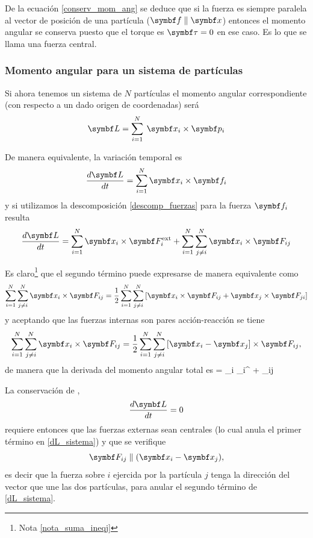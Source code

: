 \documentclass[10pt,oneside]{CBFT_book}
\begin{document}
De la ecuación \eqref{conserv_mom_ang} se deduce que si la fuerza es siempre paralela al vector de posición de una 
partícula ($\vb{f} \parallel \vb{x}$) entonces el momento angular  se conserva puesto que el torque es 
$\vb{\tau}=0$ en ese caso. Es lo que se llama una fuerza central.

\subsubsection{Momento angular para un sistema de partículas}

Si ahora tenemos un sistema de $N$ partículas el momento angular correspondiente (con respecto a un dado origen de
coordenadas) será
\[
	\vb{L} = \Sum{i=1}{N} \: \vb{x}_i \times \vb{p}_i
\]

De manera equivalente, la variación temporal es 
\[
	\dtot{\vb{L}}{t} = \Sum{i=1}{N} \vb{x}_i \times \vb{f}_i
\]
y si utilizamos la descomposición \eqref{descomp_fuerzas} para la fuerza $\vb{f}_i$ resulta
\[
	\dtot{\vb{L}}{t} = \Sum{i=1}{N} \vb{x}_i \times \vb{F}_i^\text{ext}  +
	\Sum{i=1}{N} \Sum{j\neq i}{N}  \vb{x}_i \times \vb{F}_{ij}
\]

Es claro\footnote{Nota \ref{nota_suma_ineqj}} que el segundo término puede expresarse de manera equivalente como 
\[
	\Sum{i=1}{N} \Sum{j\neq i}{N}  \vb{x}_i \times \vb{F}_{ij} =
	\frac{1}{2} 
	\Sum{i=1}{N} \Sum{j \neq i}{N}  \left[ \vb{x}_i \times \vb{F}_{ij} + \vb{x}_j \times \vb{F}_{ji} \right]
\]
y aceptando que las fuerzas internas son pares acción-reacción se tiene 
\[
	\Sum{i=1}{N} \Sum{j\neq i}{N}  \vb{x}_i \times \vb{F}_{ij} =
	\frac{1}{2} 
	\Sum{i=1}{N} \Sum{j \neq i}{N}  \left[ \vb{x}_i - \vb{x}_j \right] \times \vb{F}_{ij},
\]
de manera que la derivada del momento angular total es 
\be
	 =  _i \times {}_i^  +
	    \left[ \vb{x}_i - \vb{x}_j \right] \times {}_{ij} 
	\label{dL_sistema}
\ee

La conservación de ,
\[
	\dtot{\vb{L}}{t} = 0	
\]
requiere entonces que las fuerzas externas sean centrales (lo cual anula el primer término en \eqref{dL_sistema}) y que 
se verifique 
\[
	\vb{F}_{ij}  \parallel ( \vb{x}_i - \vb{x}_j ),
\]
es decir que la fuerza sobre $i$ ejercida por la partícula $j$ tenga la dirección del vector que une las dos 
partículas, para anular el segundo término de \eqref{dL_sistema}.
\end{document}
